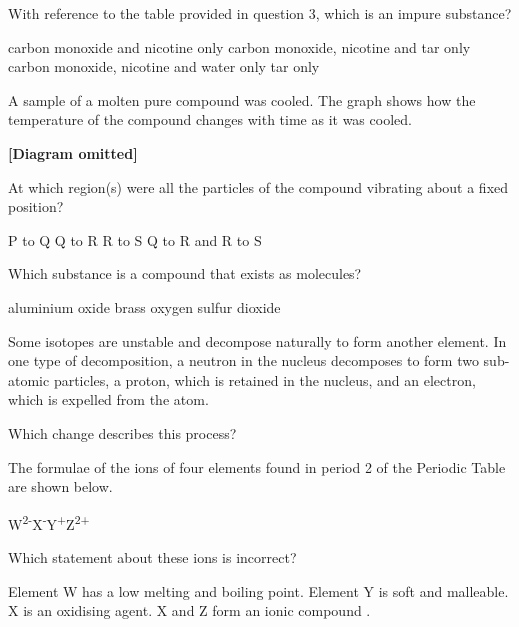 \documentclass[11pt]{exam}
\begin{document}
\begin{questions}
\question With reference to the table provided in question 3, which is an impure substance?

\begin{choices}
\choice carbon monoxide and nicotine only
\choice carbon monoxide, nicotine and tar only
\choice carbon monoxide, nicotine and water only
\choice tar only
\end{choices}

\newpage

\question A sample of a molten pure compound was cooled. The graph shows how the temperature of the compound changes with time as it was cooled.

\textbf{[Diagram omitted]}

At which region(s) were all the particles of the compound vibrating about a fixed position?

\begin{choices}
\choice P to Q
\choice Q to R
\choice R to S
\choice Q to R and R to S
\end{choices}

\question Which substance is a compound that exists as molecules?

\begin{choices}
\choice aluminium oxide
\choice brass
\choice oxygen
\choice sulfur dioxide
\end{choices}

\question Some isotopes are unstable and decompose naturally to form another element. In one type of decomposition, a neutron in the nucleus decomposes to form two sub-atomic particles, a proton, which is retained in the nucleus, and an electron, which is expelled from the atom.

Which change describes this process?

\begin{choices}
\choice {}
\choice {}
\choice {}
\choice {}
\end{choices}

\question The formulae of the ions of four elements found in period 2 of the Periodic Table are shown below.

W\textsuperscript{2-}\quad X\textsuperscript{-}\quad Y\textsuperscript{+}\quad Z\textsuperscript{2+}

Which statement about these ions is incorrect?

\begin{choices}
\choice Element W has a low melting and boiling point.
\choice Element Y is soft and malleable.
\choice X is an oxidising agent.
\choice X and Z form an ionic compound .
\end{choices}


\end{questions}
\end{document}
